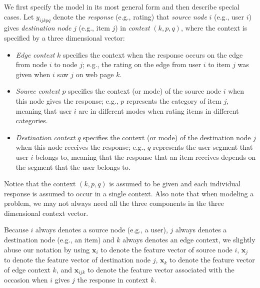 \documentclass[10pt]{article}
\begin{document}
We first specify the model in its most general form and then describe special cases.  Let $y_{ijkpq}$ denote the {\em response} (e.g., rating) that {\em source node} $i$ (e.g., user $i$) gives {\em destination node} $j$ (e.g., item $j$) in {\em context} $(k,p,q)$, where the context is specified by a three dimensional vector:
\begin{itemize}
\item {\em Edge context} $k$ specifies the context when the response occurs on the edge from node $i$ to node $j$; e.g., the rating on the edge from user $i$ to item $j$ was given when $i$ saw $j$ on web page $k$.
\item {\em Source context} $p$ specifies the context (or mode) of the source node $i$ when this node gives the response; e.g., $p$ represents the category of item $j$, meaning that user $i$ are in different modes when rating items in different categories.
\item {\em Destination context} $q$ specifies the context (or mode) of the destination node $j$ when this node receives the response; e.g., $q$ represents the user segment that user $i$ belongs to, meaning that the response that an item receives depends on the segment that the user belongs to.
\end{itemize}
Notice that the context $(k,p,q)$ is assumed to be given and each individual response is assumed to occur in a single context.  Also note that when modeling a problem, we may not always need all the three components in the three dimensional context vector.

Because $i$ always denotes a source node (e.g., a user), $j$ always denotes a destination node (e.g., an item) and $k$ always denotes an edge context, we slightly abuse our notation by using $\bm{x}_i$ to denote the feature vector of source node $i$, $\bm{x}_j$ to denote the feature vector of destination node $j$, $\bm{x}_k$ to denote the feature vector of edge context $k$, and $\bm{x}_{ijk}$ to denote the feature vector associated with the occasion when $i$ gives $j$ the response in context $k$.
\end{document}
